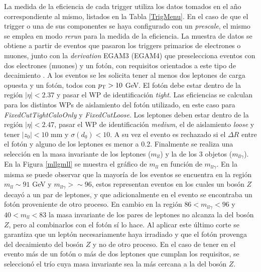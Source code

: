 La medida de la eficiencia de cada trigger utiliza los datos tomados en el año correspondiente al mismo, listados en la Tabla \ref{TrigMenu}. En el caso de que el trigger o una de sus componentes se haya configurado con un \textit{prescale}, el mismo se emplea en modo \textit{rerun} para la medida de la eficiencia. La muestra de datos se obtiene a partir de eventos que pasaron los triggers primarios de electrones o muones, junto con la \textit{derivation} EGAM3 (EGAM4) que preselecciona eventos con dos electrones (muones) y un fotón, con requisitos orientados a este tipo de decaimiento 
 . 
A los eventos se les solicita tener al menos dos leptones de carga opuesta y un fotón, todos con $p_{\text{T}}>10$ GeV. El fotón debe estar dentro de la región $|\eta| < 2.37$ y pasar el WP de identificación \textit{tight}. Las eficiencias se calculan para los distintos WPs de aislamiento del fotón utilizado, en este caso para \textit{FixedCutTightCaloOnly} y \textit{FixedCutLoose}. Los leptones deben estar dentro de la región $|\eta| < 2.47$, pasar el WP de identificación \textit{medium}, el de aislamiento \textit{loose} y tener $|z_0| < 10$ mm y $\sigma(d_0) < 10$. A su vez el evento es rechazado si el $\Delta R$ entre el fotón y alguno de los leptones es menor a 0.2. Finalmente se realiza una selección en la masa invariante de los leptones ($m_{ll}$) y la de los 3 objetos ($m_{ll\gamma}$). En la Figura \ref{mllgmll} se muestra el gráfico de $m_{ll}$ en función de $m_{ll\gamma}$. En la misma se puede observar que la mayoría de los eventos se encuentra en la región $m_{ll}\sim91$ GeV y $m_{ll\gamma}>\sim96$, estos representan eventos en los cuales un bosón $Z$ decayó a un par de leptones, y que adicionalmente en el evento se encontraba un fotón proveniente de otro proceso. En cambio en la región $86<m_{ll\gamma}<96$ y $40<m_{ll}<83$ la masa invariante de los pares de leptones no alcanza la del bosón $Z$, pero al combinarlos con el fotón sí lo hace. Al aplicar este último corte se garantiza que un leptón necesariamente haya irradiado y que el fotón provenga del decaimiento del bosón $Z$ y no de otro proceso. En el caso de tener en el evento más de un fotón o más de dos leptones que cumplan los requisitos, se seleccionó el trío cuya masa invariante sea la más cercana a la del bosón $Z$.

